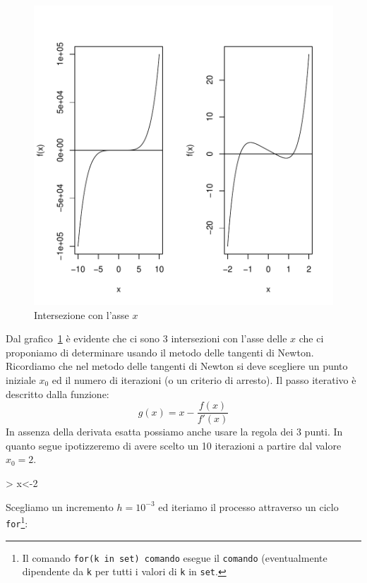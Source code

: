 \documentclass[onecolumn,11pt]{book}
\begin{document}
\begin{figure}[htbp]
\begin{center}
\includegraphics{Rmatematica-132}
\caption{Intersezione con l'asse $x$ }
\label{fig:newton}
\end{center}
\end{figure}

Dal grafico~\ref{fig:newton}  \`e evidente che ci sono 3 intersezioni con l'asse delle $x$ che ci proponiamo di determinare usando il metodo delle tangenti di Newton. Ricordiamo che nel metodo delle tangenti di Newton si deve scegliere un punto iniziale $x_0$  ed il numero di iterazioni (o un criterio di arresto).  Il passo iterativo \`e descritto dalla funzione:
$$g(x)=x-\frac{f(x)}{f'(x)}$$
In assenza della derivata esatta possiamo anche usare la regola dei 3 punti.
In quanto segue ipotizzeremo di avere scelto un 10 iterazioni a partire dal valore $x_0=2$.

\begin{Schunk}
\begin{Sinput}
> x<-2
\end{Sinput}
\end{Schunk}
Scegliamo un incremento
$h=10^{-3}$ ed 
iteriamo il processo attraverso un ciclo \texttt{for}\footnote{Il comando   \texttt{for(k in set) comando} esegue il \texttt{comando} (eventualmente dipendente da \texttt{k} per tutti i valori di \texttt{k} in \texttt{set}. }:
\end{document}
